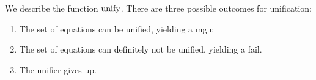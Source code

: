 We describe the function $\text{unify}$.
There are three possible outcomes for unification:
\begin{enumerate}
    \item The set of equations can be unified, yielding a mgu: 
    \item The set of equations can definitely not be unified, yielding a fail.
    \item The unifier gives up.
\end{enumerate}